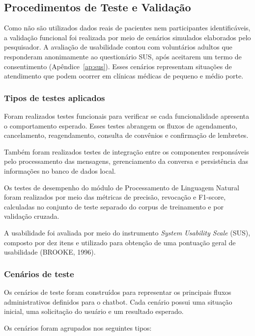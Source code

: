 \documentclass[12pt,a4paper]{extarticle}
\begin{document}
\subsection{Procedimentos de Teste e Validação}
\label{sec:testes-metodo}

Como não são utilizados dados reais de pacientes nem participantes identificáveis, a validação funcional foi realizada por meio de cenários simulados elaborados pelo pesquisador. A avaliação de usabilidade contou com voluntários adultos que responderam anonimamente ao questionário SUS, após aceitarem um termo de consentimento (Apêndice~\ref{ap:sus}). Esses cenários representam situações de atendimento que podem ocorrer em clínicas médicas de pequeno e médio porte.

\subsubsection{Tipos de testes aplicados}
\label{sec:tipos-metodo}

Foram realizados testes funcionais para verificar se cada funcionalidade apresenta o comportamento esperado. Esses testes abrangem os fluxos de agendamento, cancelamento, reagendamento, consulta de convênios e confirmação de lembretes.

Também foram realizados testes de integração entre os componentes responsáveis pelo processamento das mensagens, gerenciamento da conversa e persistência das informações no banco de dados local.

Os testes de desempenho do módulo de Processamento de Linguagem Natural foram realizados por meio das métricas de precisão, revocação e F1-score, calculadas no conjunto de teste separado do corpus de treinamento e por validação cruzada.

A usabilidade foi avaliada por meio do instrumento \textit{System Usability Scale} (SUS), composto por dez itens e utilizado para obtenção de uma pontuação geral de usabilidade (BROOKE, 1996).

\subsubsection{Cenários de teste}
\label{sec:cenarios-metodo}

Os cenários de teste foram construídos para representar os principais fluxos administrativos definidos para o chatbot. Cada cenário possui uma situação inicial, uma solicitação do usuário e um resultado esperado.

Os cenários foram agrupados nos seguintes tipos:
\end{document}
